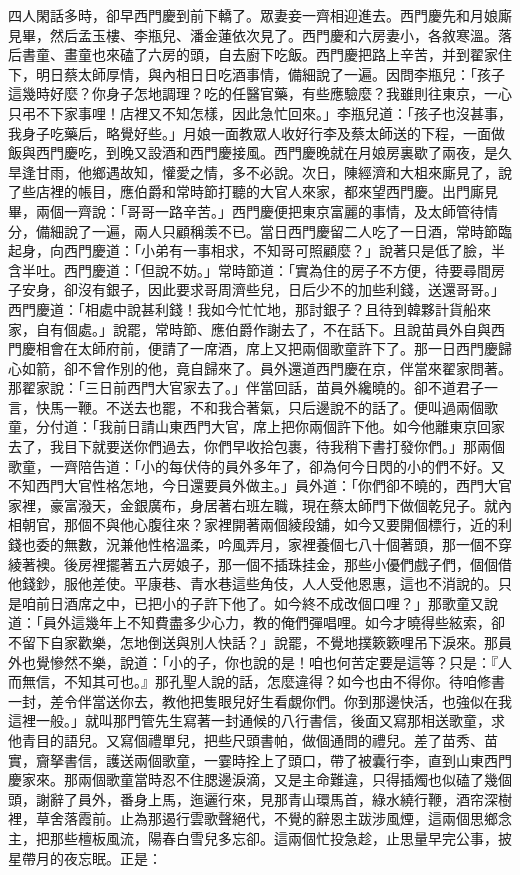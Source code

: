 四人閑話多時，卻早西門慶到前下轎了。眾妻妾一齊相迎進去。西門慶先和月娘廝見畢，然后孟玉樓、李瓶兒、潘金蓮依次見了。西門慶和六房妻小，各敘寒溫。落后書童、畫童也來磕了六房的頭，自去廚下吃飯。西門慶把路上辛苦，并到翟家住下，明日蔡太師厚情，與內相日日吃酒事情，備細說了一遍。因問李瓶兒：「孩子這幾時好麼？你身子怎地調理？吃的任醫官藥，有些應驗麼？我雖則往東京，一心只弔不下家事哩！店裡又不知怎樣，因此急忙回來。」李瓶兒道：「孩子也沒甚事，我身子吃藥后，略覺好些。」月娘一面教眾人收好行李及蔡太師送的下程，一面做飯與西門慶吃，到晚又設酒和西門慶接風。西門慶晚就在月娘房裏歇了兩夜，是久旱逢甘雨，他鄉遇故知，懽愛之情，多不必說。次日，陳經濟和大柤來廝見了，說了些店裡的帳目，應伯爵和常時節打聽的大官人來家，都來望西門慶。出門廝見畢，兩個一齊說：「哥哥一路辛苦。」西門慶便把東京富麗的事情，及太師管待情分，備細說了一遍，兩人只顧稱羡不已。當日西門慶留二人吃了一日酒，常時節臨起身，向西門慶道：「小弟有一事相求，不知哥可照顧麼？」說著只是低了臉，半含半吐。西門慶道：「但說不妨。」常時節道：「實為住的房子不方便，待要尋間房子安身，卻沒有銀子，因此要求哥周濟些兒，日后少不的加些利錢，送還哥哥。」西門慶道：「相處中說甚利錢！我如今忙忙地，那討銀子？且待到韓夥計貨船來家，自有個處。」說罷，常時節、應伯爵作謝去了，不在話下。且說苗員外自與西門慶相會在太師府前，便請了一席酒，席上又把兩個歌童許下了。那一日西門慶歸心如箭，卻不曾作別的他，竟自歸來了。員外還道西門慶在京，伴當來翟家問著。那翟家說：「三日前西門大官家去了。」伴當回話，苗員外纔曉的。卻不道君子一言，快馬一鞭。不送去也罷，不和我合著氣，只后邊說不的話了。便叫過兩個歌童，分付道：「我前日請山東西門大官，席上把你兩個許下他。如今他離東京回家去了，我目下就要送你們過去，你們早收拾包裹，待我稍下書打發你們。」那兩個歌童，一齊陪告道：「小的每伏侍的員外多年了，卻為何今日閃的小的們不好。又不知西門大官性格怎地，今日還要員外做主。」員外道：「你們卻不曉的，西門大官家裡，豪富潑天，金銀廣布，身居著右班左職，現在蔡太師門下做個乾兒子。就內相朝官，那個不與他心腹往來？家裡開著兩個綾段舖，如今又要開個標行，近的利錢也委的無數，況兼他性格溫柔，吟風弄月，家裡養個七八十個著頭，那一個不穿綾著襖。後房裡擺著五六房娘子，那一個不插珠挂金，那些小優們戲子們，個個借他錢鈔，服他差使。平康巷、青水巷這些角伎，人人受他恩惠，這也不消說的。只是咱前日酒席之中，已把小的子許下他了。如今終不成改個口哩？」那歌童又說道：「員外這幾年上不知費盡多少心力，教的俺們彈唱哩。如今才曉得些絃索，卻不留下自家歡樂，怎地倒送與別人快話？」說罷，不覺地撲簌簌哩吊下淚來。那員外也覺慘然不樂，說道：「小的子，你也說的是！咱也何苦定要是這等？只是：『人而無信，不知其可也。』那孔聖人說的話，怎麼違得？如今也由不得你。待咱修書一封，差令伴當送你去，教他把隻眼兒好生看覷你們。你到那邊快活，也強似在我這裡一般。」就叫那門管先生寫著一封通候的八行書信，後面又寫那相送歌童，求他青目的語兒。又寫個禮單兒，把些尺頭書帕，做個通問的禮兒。差了苗秀、苗實，齎拏書信，護送兩個歌童，一霎時拴上了頭口，帶了被囊行李，直到山東西門慶家來。那兩個歌童當時忍不住腮邊淚滴，又是主命難違，只得插燭也似磕了幾個頭，謝辭了員外，番身上馬，迤邐行來，見那青山環馬首，綠水繞行鞭，酒帘深樹裡，草舍落霞前。止為那遏行雲歌聲絕代，不覺的辭恩主跋涉風煙，這兩個思鄉念主，把那些檀板風流，陽春白雪兒多忘卻。這兩個忙投急趁，止思量早完公事，披星帶月的夜忘眠。正是：

